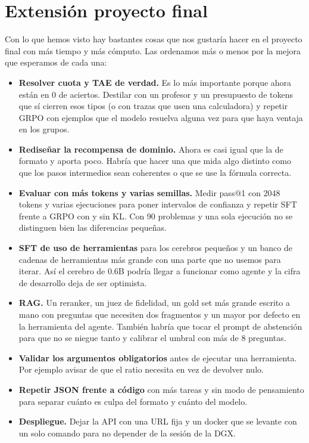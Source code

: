 \documentclass[10pt,a4paper]{article}
\newcommand{\code}[1]{\texttt{\detokenize{#1}}}
\begin{document}
\section{Extensión proyecto final}
Con lo que hemos visto hay bastantes cosas que nos gustaría hacer en el proyecto final con más tiempo y más cómputo. Las ordenamos más o menos por la mejora que esperamos de cada una:
\begin{itemize}
\item \textbf{Resolver cuota y TAE de verdad.} Es lo más importante porque ahora están en 0 de aciertos. Destilar con un profesor y un presupuesto de tokens que sí cierren esos tipos (o con trazas que usen una calculadora) y repetir GRPO con ejemplos que el modelo resuelva alguna vez para que haya ventaja en los grupos.
\item \textbf{Rediseñar la recompensa de dominio.} Ahora es casi igual que la de formato y aporta poco. Habría que hacer una que mida algo distinto como que los pasos intermedios sean coherentes o que se use la fórmula correcta.
\item \textbf{Evaluar con más tokens y varias semillas.} Medir pass@1 con 2048 tokens y varias ejecuciones para poner intervalos de confianza y repetir SFT frente a GRPO con y sin KL. Con 90 problemas y una sola ejecución no se distinguen bien las diferencias pequeñas.
\item \textbf{SFT de uso de herramientas} para los cerebros pequeños y un banco de cadenas de herramientas más grande con una parte que no usemos para iterar. Así el cerebro de 0.6B podría llegar a funcionar como agente y la cifra de desarrollo deja de ser optimista.
\item \textbf{RAG.} Un reranker, un juez de fidelidad, un gold set más grande escrito a mano con preguntas que necesiten dos fragmentos y un \code{top_k} mayor por defecto en la herramienta del agente. También habría que tocar el prompt de abstención para que no se niegue tanto y calibrar el umbral con más de 8 preguntas.
\item \textbf{Validar los argumentos obligatorios} antes de ejecutar una herramienta. Por ejemplo avisar de que el ratio necesita \code{monthly_income} en vez de devolver nulo.
\item \textbf{Repetir JSON frente a código} con más tareas y sin modo de pensamiento para separar cuánto es culpa del formato y cuánto del modelo.
\item \textbf{Despliegue.} Dejar la API con una URL fija y un docker que se levante con un solo comando para no depender de la sesión de la DGX.
\end{itemize}
\end{document}
